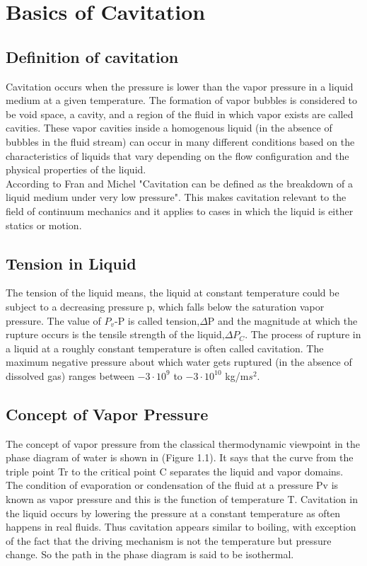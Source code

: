 \chapter{Basics of Cavitation}
\label{chap:chapter1}
\section{Definition of cavitation}

Cavitation occurs when the pressure is lower than the vapor pressure
in a liquid medium at a given temperature. The formation of vapor
bubbles is considered to be void space, a cavity, and a region of the
fluid in which vapor exists are called cavities. These vapor cavities
inside a homogenous liquid (in the absence of bubbles in the fluid
stream) can occur in many different conditions based on the
characteristics of liquids that vary depending on the flow
configuration and the physical properties of the liquid.\\

According to Fran and Michel\cite{FundamentalsofCavitation.2004}
"Cavitation can be defined as the breakdown of a liquid medium under
very low pressure".  This makes cavitation relevant to the field of
continuum mechanics and it applies to cases in which the liquid is
either statics or motion.\\

\section{Tension in Liquid}
The tension of the liquid means, the liquid at constant temperature
could be subject to a decreasing pressure p, which falls below the
saturation vapor pressure. The value of $P_v$-P is called
tension,$\Delta$P and the magnitude at which the rupture occurs is the
tensile strength of the liquid,$\Delta P_C$. The process of rupture in
a liquid at a roughly constant temperature is often called cavitation.
The maximum negative pressure about which water gets ruptured (in the
absence of dissolved gas) ranges between $-3\cdot 10^9$ to $ -3\cdot
10^{10} $ kg/m$s^2$.

\section{Concept of Vapor Pressure} 
The concept of vapor pressure from the classical thermodynamic
viewpoint in the phase diagram of water is shown in (Figure 1.1). It
says that the curve from the triple point Tr to the critical point C
separates the liquid and vapor domains. The condition of evaporation
or condensation of the fluid at a pressure Pv is known as vapor
pressure and this is the function of temperature T.  Cavitation in
the liquid occurs by lowering the pressure at a constant temperature
as often happens in real fluids. Thus cavitation appears similar to
boiling, with exception of the fact that the driving mechanism is not
the temperature but pressure change. So the path in the phase diagram
is said to be isothermal.\\

